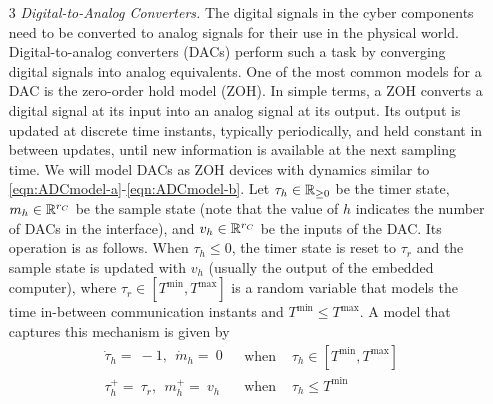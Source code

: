 \documentclass{article}
\begin{document}
\begin{enumerate}
\item[3] {\em Digital-to-Analog Converters.}
The digital signals in the cyber components need to be converted
to analog signals for their use in the physical world.
Digital-to-analog converters (DACs) perform such a task 
by converging digital signals into analog equivalents.
One of the most common models for a DAC
is the zero-order hold model (ZOH). In simple terms, a ZOH converts
a digital signal at its input into an analog signal 
at its output.  
Its output is updated at discrete time instants, typically periodically,
and held constant in between updates, until new information is available at the
next sampling time. We will model DACs as ZOH devices with dynamics
similar to \eqref{eqn:ADCmodel-a}-\eqref{eqn:ADCmodel-b}. Let
$\tau_h\in{{\mathbb R}_{\geq 0}}$ be the timer state, $m_h \in {\mathbb R}^{r_C}$ be the
sample state (note that the value of $h$ indicates the number of DACs
in the interface), and $v_h \in {\mathbb R}^{r_C}$ be the inputs of the DAC.
Its operation is as follows. When $\tau_h \leq 0$, the timer state
is reset to $\tau_r$ and the sample state is updated with $v_h$ (usually
the output of the embedded computer), where $\tau_r\in[T^{\mbox{min}},T^{\mbox{max}}]$ 
is a random variable that models the time in-between communication instants and 
$T^{\mbox{min}}\leq T^{\mbox{max}}$. A model that captures this
mechanism is given by 
\begin{eqnarray}\label{eqn:DACmodel-a}
\left.
\begin{array}{l}
\dot{\tau}_h =\ -1,   \ \
\dot{m}_h  =\ 0
\end{array}
\right. & \mbox{ when }& \tau_h \in [T^{\mbox{min}},T^{\mbox{max}}] \\ \label{eqn:DACmodel-b}
\left.
\begin{array}{ll}
\tau_h^+  =\ \tau_r,  \ \
m_h^+ =\ v_h
\end{array}
\right. & \mbox{ when }& \tau_h \leq T^{\mbox{min}}
\end{eqnarray}
\medskip


\end{enumerate}
\end{document}
